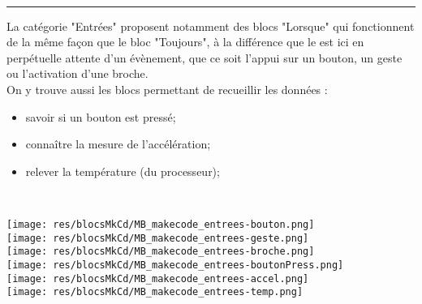\begin{minipage}[t]{0.75\linewidth}

    \begin{blocEntrees}\\
      \rule{-0.25em}{2em}
La catégorie "Entrées" proposent notamment des blocs "Lorsque" qui fonctionnent de la même façon que le bloc "Toujours", à la différence que le \mb est ici en perpétuelle attente d'un évènement, que ce soit l'appui sur un bouton, un geste ou l'activation d'une broche.\\
\vspace{5mm}
On y trouve aussi les blocs permettant de recueillir les données :
\begin{itemize}
  \item savoir si un bouton est pressé;
  \item connaître la mesure de l'accélération;
  \item relever la température (du processeur);
\end{itemize}

    \end{blocEntrees}

\end{minipage}
\hfill
\begin{minipage}[t]{0.25\linewidth}~\\
  \vspace{5mm}

    \texttt{[image: res/blocsMkCd/MB\_makecode\_entrees-bouton.png]}\\[0.5em]
    \texttt{[image: res/blocsMkCd/MB\_makecode\_entrees-geste.png]}\\[0.5em]
    \texttt{[image: res/blocsMkCd/MB\_makecode\_entrees-broche.png]}\\[0.5em]
    \texttt{[image: res/blocsMkCd/MB\_makecode\_entrees-boutonPress.png]}\\[0.5em]
    \texttt{[image: res/blocsMkCd/MB\_makecode\_entrees-accel.png]}\\[0.5em]
    \texttt{[image: res/blocsMkCd/MB\_makecode\_entrees-temp.png]}


\end{minipage}


